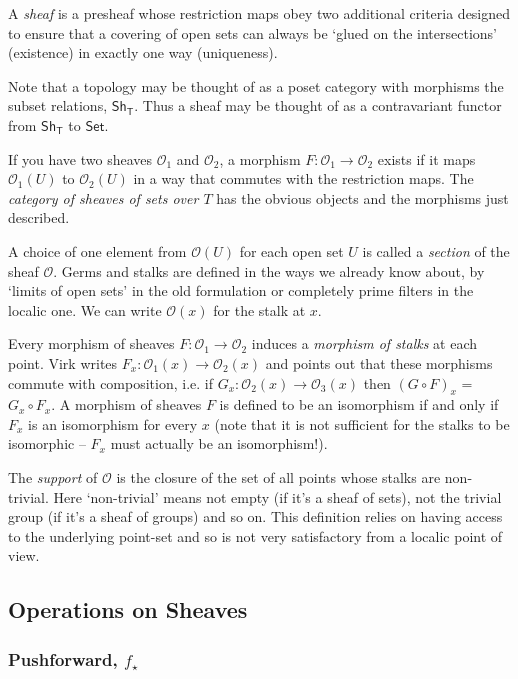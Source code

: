 \documentclass[oneside,english]{amsbook}
\numberwithin{section}{chapter}
\theoremstyle{plain}
\theoremstyle{definition}
\newcommand{\cat}[1]{\boldsymbol{\mathsf{#1}}}
\begin{document}
A \emph{sheaf} is a presheaf whose restriction maps obey two additional criteria designed to ensure that a covering of open sets can always be `glued on the intersections' (existence) in exactly one way (uniqueness).

Note that a topology may be thought of as a poset category with morphisms the subset relations, $\cat{Sh_T}$. Thus a sheaf may be thought of as a contravariant functor from $\cat{Sh_T}$ to $\cat{Set}$. 

If you have two sheaves $\mathscr{O}_1$ and $\mathscr{O}_2$, a morphism $F:\mathscr{O}_1\to\mathscr{O}_2$ exists if it maps $\mathscr{O}_1(U)$ to $\mathscr{O}_2(U)$ in a way that commutes with the restriction maps. The \emph{category of sheaves of sets over $T$} has the obvious objects and the morphisms just described.

A choice of one element from $\mathscr{O}(U)$ for each open set $U$ is called a \emph{section} of the sheaf $\mathscr{O}$. Germs and stalks are defined in the ways we already know about, by `limits of open sets' in the old formulation or completely prime filters in the localic one. We can write $\mathscr{O}(x)$ for the stalk at $x$.

Every morphism of sheaves $F:\mathscr{O}_1\to \mathscr{O}_2$ induces a \emph{morphism of stalks} at each point. Virk writes $F_x:\mathscr{O}_1(x)\to \mathscr{O}_2(x)$ and points out that these morphisms commute with composition, i.e. if  $G_x:\mathscr{O}_2(x)\to \mathscr{O}_3(x)$ then $(G\circ F)_x$ = $G_x\circ F_x$. A morphism of sheaves $F$ is defined to be an isomorphism if and only if $F_x$ is an isomorphism for every $x$ (note that it is not sufficient for the stalks to be isomorphic -- $F_x$ must actually be an isomorphism!).

The \emph{support} of $\mathscr{O}$ is the closure of the set of all points whose stalks are non-trivial. Here `non-trivial' means not empty (if it's a sheaf of sets), not the trivial group (if it's a sheaf of groups) and so on. This definition relies on having access to the underlying point-set and so is not very satisfactory from a localic point of view.

\subsection{Operations on Sheaves}

\subsubsection{Pushforward, $f_\star$}
\end{document}
